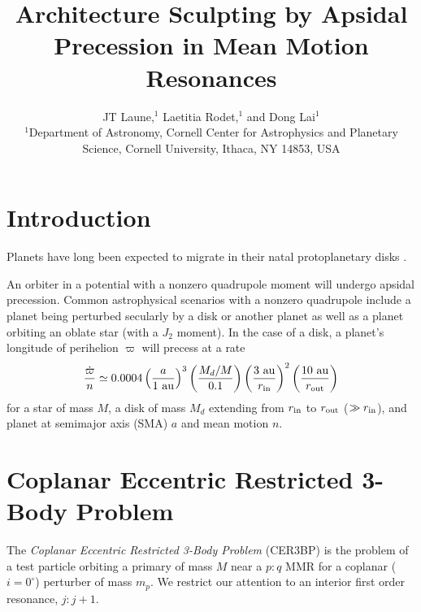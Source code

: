 \documentclass[usenatbib,twocolumn]{mnras}
\title[Apsidal Precession in MMR]{Architecture Sculpting by Apsidal Precession in Mean Motion Resonances}
\author[Laune et al.]{ JT Laune,$^{1}$ Laetitia Rodet,$^{1}$ and Dong
  Lai$^{1}$
  \\
  $^{1}$Department of Astronomy, Cornell Center for Astrophysics and
  Planetary Science, Cornell University, Ithaca, NY 14853, USA \\}
\begin{document}
\maketitle

\section{Introduction}
    Planets have long been expected to migrate in their natal protoplanetary disks \citep[PPDs; e.g.][]{nelson00_migrat_growt_protop_protos_discs}.

    An orbiter in a potential with a nonzero quadrupole moment will undergo apsidal precession. 
    Common astrophysical scenarios with a nonzero quadrupole include a planet being perturbed secularly by a disk or another planet as well as a planet orbiting an oblate star (with a $J_2$ moment). 
    In the case of a disk, a planet's longitude of perihelion $\varpi$ will precess at a rate
    \begin{equation}\label{eq:diskprecscaling}
        \frac{\dot\varpi}{n} \simeq 0.0004\left(\frac{a}{1~\rm{au}}\right)^3\left(\frac{M_d/M}{0.1}\right)\left(\frac{3~\rm{au}}{r_{\rm in}}\right)^2\left(\frac{10~\rm{au}}{r_{\rm out}}\right)
    \end{equation}
    for a star of mass $M$, a disk of mass $M_d$ extending from $r_{\rm in}$ to $r_{\rm out}$ ($\gg r_{\rm in}$), and planet at semimajor axis (SMA) $a$ and mean motion $n$.


\section{Coplanar Eccentric Restricted 3-Body Problem}
\label{sec:CER3BP}
The \emph{Coplanar Eccentric Restricted 3-Body Problem} (CER3BP) is the problem of a test particle orbiting a primary of mass $M$ near a $p:q$ MMR for a coplanar ($i=0^\circ$) perturber of mass $m_p$.
We restrict our attention to an interior first order resonance, $j:j+1$.
\end{document}
